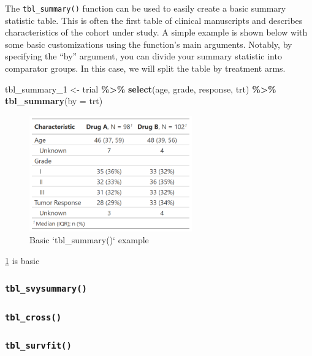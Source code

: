 \documentclass[
]{article}
\newenvironment{Shaded}{\begin{snugshade}}{\end{snugshade}}
\newcommand{\DataTypeTok}[1]{\textcolor[rgb]{0.13,0.29,0.53}{#1}}
\newcommand{\DecValTok}[1]{\textcolor[rgb]{0.00,0.00,0.81}{#1}}
\newcommand{\KeywordTok}[1]{\textcolor[rgb]{0.13,0.29,0.53}{\textbf{#1}}}
\newcommand{\NormalTok}[1]{#1}
\newcommand{\OperatorTok}[1]{\textcolor[rgb]{0.81,0.36,0.00}{\textbf{#1}}}
\newcommand{\StringTok}[1]{\textcolor[rgb]{0.31,0.60,0.02}{#1}}
\begin{document}
The \texttt{tbl\_summary()} function can be used to easily create a
basic summary statistic table. This is often the first table of clinical
manuscripts and describes characteristics of the cohort under study. A
simple example is shown below with some basic customizations using the
function's main arguments. Notably, by specifying the ``by'' argument,
you can divide your summary statistic into comparator groups. In this
case, we will split the table by treatment arms.

\begin{Shaded}
\begin{Highlighting}[]
\NormalTok{tbl\_summary\_}\DecValTok{1}\NormalTok{ <{-}}
\StringTok{  }\NormalTok{trial }\OperatorTok{\%>\%}
\StringTok{  }\KeywordTok{select}\NormalTok{(age, grade, response, trt) }\OperatorTok{\%>\%}
\StringTok{  }\KeywordTok{tbl\_summary}\NormalTok{(}\DataTypeTok{by =}\NormalTok{ trt)}
\end{Highlighting}
\end{Shaded}

\begin{figure}[h!]
  \caption{Basic `tbl\_summary()` example}
  \label{fig:summary_basic}
  \includegraphics[height=5cm]{tbl_summary_1.png}
  \centering
\end{figure}

\ref{fig:summary_basic} is basic

\hypertarget{tbl_svysummary}{%
\subsubsection{\texorpdfstring{\texttt{tbl\_svysummary()}}{tbl\_svysummary()}}\label{tbl_svysummary}}

\hypertarget{tbl_cross}{%
\subsubsection{\texorpdfstring{\texttt{tbl\_cross()}}{tbl\_cross()}}\label{tbl_cross}}

\hypertarget{tbl_survfit}{%
\subsubsection{\texorpdfstring{\texttt{tbl\_survfit()}}{tbl\_survfit()}}\label{tbl_survfit}}
\end{document}
